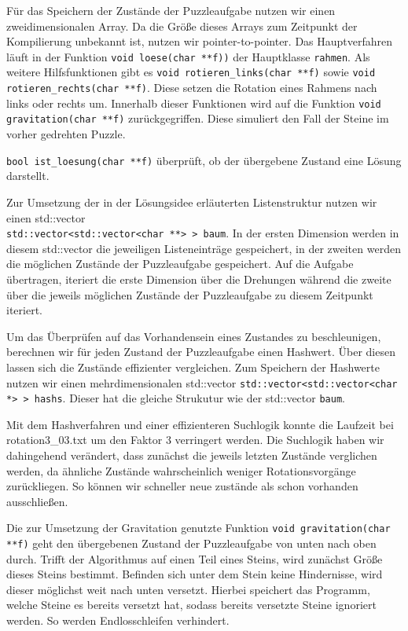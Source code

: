 Für das Speichern der Zustände der Puzzleaufgabe nutzen wir einen zweidimensionalen Array. 
Da die Größe dieses Arrays zum Zeitpunkt der Kompilierung unbekannt ist, nutzen wir pointer-to-pointer.
Das Hauptverfahren läuft in der Funktion \texttt{void loese(char **f))} der Hauptklasse \texttt{rahmen}.
Als weitere Hilfsfunktionen gibt es \texttt{void rotieren\_links(char **f)} sowie \texttt{void rotieren\_rechts(char **f)}. Diese setzen die Rotation eines Rahmens nach links oder rechts um.
Innerhalb dieser Funktionen wird auf die Funktion \texttt{void gravitation(char **f)} zurückgegriffen. Diese simuliert den Fall der Steine im vorher gedrehten Puzzle.

\texttt{bool ist\_loesung(char **f)} überprüft, ob der übergebene Zustand eine Lösung darstellt.

Zur Umsetzung der in der Lösungsidee erläuterten Listenstruktur nutzen wir einen std::vector \\\texttt{std::vector<std::vector<char **> > baum}.
In der ersten Dimension werden in diesem std::vector die jeweiligen Listeneinträge gespeichert, in der zweiten werden die möglichen Zustände der Puzzleaufgabe gespeichert. 
Auf die Aufgabe übertragen, iteriert die erste Dimension über die Drehungen während die zweite über die jeweils möglichen Zustände der Puzzleaufgabe zu diesem Zeitpunkt iteriert.

Um das Überprüfen auf das Vorhandensein eines Zustandes zu beschleunigen, berechnen wir für jeden Zustand der Puzzleaufgabe einen Hashwert.
Über diesen lassen sich  die Zustände effizienter vergleichen. Zum Speichern der Hashwerte nutzen 
wir einen mehrdimensionalen std::vector \texttt{std::vector<std::vector<char *> > hashs}. Dieser hat die gleiche Strukutur wie der std::vector \texttt{baum}.

Mit dem Hashverfahren und einer effizienteren Suchlogik konnte die Laufzeit bei rotation3\_03.txt um den Faktor 3 verringert werden.
Die Suchlogik haben wir dahingehend verändert, dass zunächst die jeweils letzten Zustände verglichen werden, da ähnliche Zustände wahrscheinlich weniger Rotationsvorgänge zurückliegen. So können wir schneller neue zustände als schon vorhanden ausschließen.

Die zur Umsetzung der Gravitation genutzte Funktion \texttt{void gravitation(char **f)} geht den übergebenen Zustand der Puzzleaufgabe von unten nach oben durch.
Trifft der Algorithmus auf einen Teil eines Steins, wird zunächst Größe dieses Steins bestimmt. Befinden sich unter dem Stein keine Hindernisse, 
wird dieser möglichst weit nach unten versetzt. Hierbei speichert das Programm, welche Steine es bereits versetzt hat, sodass bereits versetzte Steine ignoriert werden. So werden Endlosschleifen verhindert.